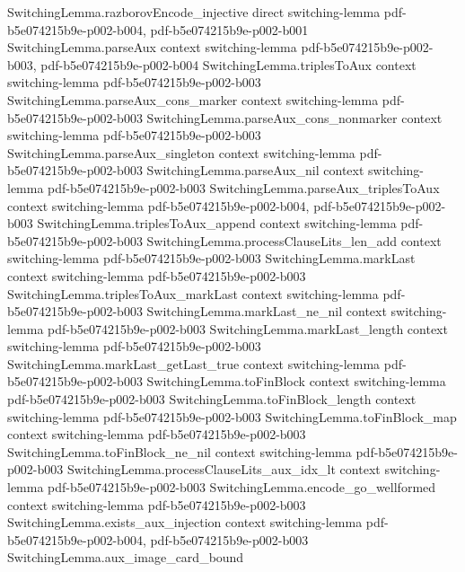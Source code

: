 \begin{theorem}
\proofstep
  {SwitchingLemma.razborovEncode_injective}
  {direct}
  {switching-lemma}
  {pdf-b5e074215b9e-p002-b004,
    pdf-b5e074215b9e-p002-b001}
\proofstep
  {SwitchingLemma.parseAux}
  {context}
  {switching-lemma}
  {pdf-b5e074215b9e-p002-b003,
    pdf-b5e074215b9e-p002-b004}
\proofstep
  {SwitchingLemma.triplesToAux}
  {context}
  {switching-lemma}
  {pdf-b5e074215b9e-p002-b003}
\proofstep
  {SwitchingLemma.parseAux_cons_marker}
  {context}
  {switching-lemma}
  {pdf-b5e074215b9e-p002-b003}
\proofstep
  {SwitchingLemma.parseAux_cons_nonmarker}
  {context}
  {switching-lemma}
  {pdf-b5e074215b9e-p002-b003}
\proofstep
  {SwitchingLemma.parseAux_singleton}
  {context}
  {switching-lemma}
  {pdf-b5e074215b9e-p002-b003}
\proofstep
  {SwitchingLemma.parseAux_nil}
  {context}
  {switching-lemma}
  {pdf-b5e074215b9e-p002-b003}
\proofstep
  {SwitchingLemma.parseAux_triplesToAux}
  {context}
  {switching-lemma}
  {pdf-b5e074215b9e-p002-b004,
    pdf-b5e074215b9e-p002-b003}
\proofstep
  {SwitchingLemma.triplesToAux_append}
  {context}
  {switching-lemma}
  {pdf-b5e074215b9e-p002-b003}
\proofstep
  {SwitchingLemma.processClauseLits_len_add}
  {context}
  {switching-lemma}
  {pdf-b5e074215b9e-p002-b003}
\proofstep
  {SwitchingLemma.markLast}
  {context}
  {switching-lemma}
  {pdf-b5e074215b9e-p002-b003}
\proofstep
  {SwitchingLemma.triplesToAux_markLast}
  {context}
  {switching-lemma}
  {pdf-b5e074215b9e-p002-b003}
\proofstep
  {SwitchingLemma.markLast_ne_nil}
  {context}
  {switching-lemma}
  {pdf-b5e074215b9e-p002-b003}
\proofstep
  {SwitchingLemma.markLast_length}
  {context}
  {switching-lemma}
  {pdf-b5e074215b9e-p002-b003}
\proofstep
  {SwitchingLemma.markLast_getLast_true}
  {context}
  {switching-lemma}
  {pdf-b5e074215b9e-p002-b003}
\proofstep
  {SwitchingLemma.toFinBlock}
  {context}
  {switching-lemma}
  {pdf-b5e074215b9e-p002-b003}
\proofstep
  {SwitchingLemma.toFinBlock_length}
  {context}
  {switching-lemma}
  {pdf-b5e074215b9e-p002-b003}
\proofstep
  {SwitchingLemma.toFinBlock_map}
  {context}
  {switching-lemma}
  {pdf-b5e074215b9e-p002-b003}
\proofstep
  {SwitchingLemma.toFinBlock_ne_nil}
  {context}
  {switching-lemma}
  {pdf-b5e074215b9e-p002-b003}
\proofstep
  {SwitchingLemma.processClauseLits_aux_idx_lt}
  {context}
  {switching-lemma}
  {pdf-b5e074215b9e-p002-b003}
\proofstep
  {SwitchingLemma.encode_go_wellformed}
  {context}
  {switching-lemma}
  {pdf-b5e074215b9e-p002-b003}
\proofstep
  {SwitchingLemma.exists_aux_injection}
  {context}
  {switching-lemma}
  {pdf-b5e074215b9e-p002-b004,
    pdf-b5e074215b9e-p002-b003}
\proofstep
  {SwitchingLemma.aux_image_card_bound}

\end{theorem}
